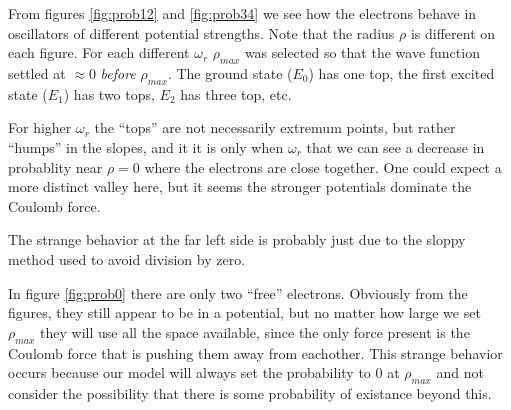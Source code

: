

From figures \ref{fig:prob12} and \ref{fig:prob34} we see how the electrons behave in oscillators of different potential strengths. Note that the radius $\rho$ is different on each figure. For each different $\omega_r$ $\rho_{max}$ was selected so that the wave function settled at $\approx 0$ \emph{before} $\rho_{max}$. The ground state ($E_0$) has one top, the first excited state ($E_1$) has two tops, $E_2$ has three top, etc.

For higher $\omega_r$ the ``tops'' are not necessarily extremum points, but rather ``humps'' in the slopes, and it it is only when $\omega_r$ that we can see a decrease in probablity near $\rho = 0$ where the electrons are close together. One could expect a more distinct valley here, but it seems the stronger potentials dominate the Coulomb force.

The strange behavior at the far left side is probably just due to the sloppy method used to avoid division by zero.


In figure \ref{fig:prob0} there are only two ``free'' electrons. Obviously from the figures, they still appear to be in a potential, but no matter how large we set $\rho_{max}$ they will use all the space available, since the only force present is the Coulomb force that is pushing them away from eachother. This strange behavior occurs because our model will always set the probability to 0 at $\rho_{max}$ and not consider the possibility that there is some probability of existance beyond this.
